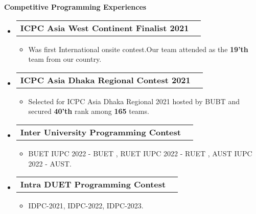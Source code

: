 \documentclass[legalpaper,10pt]{article}
\makeatletter
\newcommand{\resheading}[1]{{\large \colorbox{mygrey}{\begin{minipage}{\textwidth}{\textbf{#1 \vphantom{p\^{E}}}}\end{minipage}}}}
\newcommand{\ressubheading}[4]{
	\begin{tabular*}{7.1in}{l@{\extracolsep{\fill}}r}
		\textbf{#1} & \textit{#4} \\
	\end{tabular*}\vspace{-6pt}}
\makeatother
\begin{document}
        \resheading{Competitive Programming Experiences}
	\begin{itemize}
            \vspace{0.10in}
            \item \ressubheading{ICPC Asia West Continent Finalist 2021}{}{}{}
            \begin{itemize}
		    \item Was first International onsite contest.Our team attended as the \textbf{19'th} team from our country.
		\end{itemize}
             \item \ressubheading{ICPC Asia Dhaka Regional Contest 2021}{}{}{}
             \begin{itemize}
		    \item  Selected for ICPC Asia Dhaka Regional 2021 hosted by BUBT and secured \textbf{40'th} rank among \textbf{165} teams.
		\end{itemize}
            \item \ressubheading{Inter University Programming Contest}{}{}{}
             \begin{itemize}
		    \item BUET IUPC 2022 - BUET ,  RUET IUPC 2022 - RUET , AUST IUPC 2022 - AUST.
		\end{itemize}
  
            \item \ressubheading{Intra DUET Programming Contest}{}{}{}
             \begin{itemize}
		    \item IDPC-2021, IDPC-2022, IDPC-2023.
		\end{itemize}
            
	\end{itemize}

        \vspace{0.25in}
	
\end{document}
